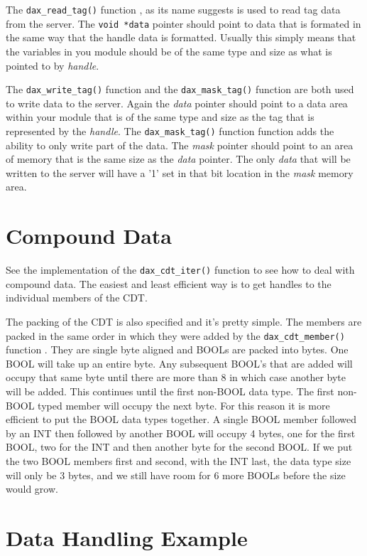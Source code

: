 The \verb|dax_read_tag()| function , as its name suggests is used to read tag data from the server.  The \verb|void *data| pointer should point to data that is formated in the same way that the handle data is formatted.  Usually this simply means that the variables in you module should be of the same type and size as what is pointed to by \emph{handle}.

The \verb|dax_write_tag()| function  and the \verb|dax_mask_tag()| function  are both used to write data to the server.  Again the \emph{data} pointer should point to a data area within your module that is of the same type and size as the tag that is represented by the \emph{handle}.  The \verb|dax_mask_tag()| function function adds the ability to only write part of the data.  The \emph{mask} pointer should point to an area of memory that is the same size as the \emph{data} pointer.  The only \emph{data} that will be written to the server will have a '1' set in that bit location in the \emph{mask} memory area.

\section{Compound Data}

See the implementation of the \verb|dax_cdt_iter()| function  to see how to deal with compound data.  The easiest and least efficient way is to get handles to the individual members of the CDT.

The packing of the CDT is also specified and it's pretty simple.  The members are packed in the same order in which they were added by the  \verb|dax_cdt_member()| function .  They are single byte aligned and BOOLs are packed into bytes.  One BOOL will take up an entire byte.  Any subsequent BOOL's that are added will occupy that same byte until there are more than 8 in which case another byte will be added.  This continues until the first non-BOOL data type.  The first non-BOOL typed member will occupy the next byte.  For this reason it is more efficient to put the BOOL data types together.  A single BOOL member followed by an INT then followed by another BOOL will occupy 4 bytes, one for the first BOOL, two for the INT and then another byte for the second BOOL.  If we put the two BOOL members first and second, with the INT last, the data type size will only be 3 bytes, and we still have room for 6 more BOOLs before the size would grow.

\section{Data Handling Example}
